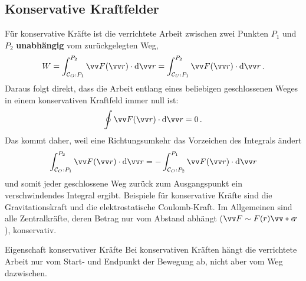 \subsection{Konservative Kraftfelder}\label{subsec: konservative_kraftfelder}
Für konservative Kräfte ist die verrichtete Arbeit zwischen zwei Punkten $P_1$ und $P_2$ \textbf{unabhängig} vom zurückgelegten Weg, 
\begin{equation}\label{eq: arbeit_konservativ}
    W = \int_{\mathcal{C}_O: P_1}^{P_2} \ivec{F}(\ivec{r}) \cdot \dd\ivec{r} = \int_{\mathcal{C}_U: P_1}^{P_2} \ivec{F}(\ivec{r}) \cdot \dd\ivec{r} \mDot
\end{equation}
Daraus folgt direkt, dass die Arbeit entlang eines beliebigen geschlossenen Weges in einem konservativen Kraftfeld immer null ist: 
\begin{equation}\label{eq: arbeit_konservativ_geschlossen}
    \oint \ivec{F}(\ivec{r}) \cdot \dd\ivec{r} = 0 \mDot
\end{equation}
Das kommt daher, weil eine Richtungsumkehr das Vorzeichen des Integrals ändert
\begin{equation}
    \int_{\mathcal{C}_O: P_1}^{P_2} \ivec{F}(\ivec{r}) \cdot \dd\ivec{r} = - \int_{\mathcal{C}_O: P_2}^{P_1} \ivec{F}(\ivec{r}) \cdot \dd\ivec{r}
\end{equation}
und somit jeder geschlossene Weg zurück zum Ausgangspunkt ein verschwindendes Integral ergibt. Beispiele für konservative Kräfte sind die Gravitationskraft und die elektrostatische Coulomb-Kraft. Im Allgemeinen sind alle Zentralkräfte, deren Betrag nur vom Abstand abhängt ($\ivec{F} \sim F(r)\ivecS{e}{r}$), konservativ. 

\begin{importantbox}{Eigenschaft konservativer Kräfte}
    Bei konservativen Kräften hängt die verrichtete Arbeit nur vom Start- und Endpunkt der Bewegung ab, nicht aber vom Weg dazwischen. 
\end{importantbox}

